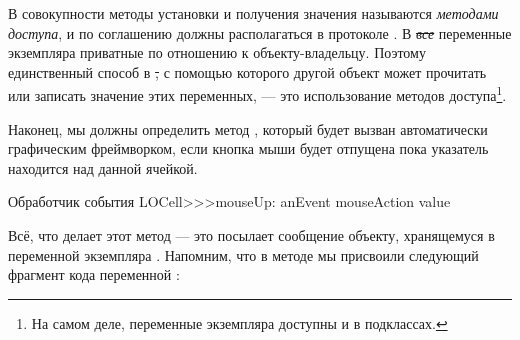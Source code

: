 \documentclass[a4paper,10pt,twoside]{book}
\begin{document}
В совокупности методы установки и получения значения называются \emph{методами доступа}, и по соглашению должны располагаться в протоколе .
В \st \emph{все} переменные экземпляра приватные по отношению к объекту-владельцу. Поэтому единственный способ в \st, с помощью которого другой объект может прочитать или записать значение этих переменных, --- это использование методов доступа\footnote{На самом деле, переменные экземпляра доступны и в подклассах.}.


Наконец, мы должны определить метод , который будет вызван автоматически графическим фреймворком, если кнопка мыши будет отпущена пока указатель находится над данной ячейкой.

\begin{method}[sbecellmouseup]{Обработчик события}
LOCell>>>mouseUp: anEvent
   mouseAction value
\end{method}


Всё, что делает этот метод --- это посылает сообщение  объекту, хранящемуся в переменной экземпляра . 
Напомним, что в методе  мы присвоили следующий фрагмент кода переменной :
\end{document}
